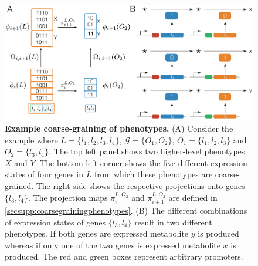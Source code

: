 \begin{figure}[!ht]
\centering
\noindent\includegraphics[width=0.9\columnwidth]{fig/phenotypehierarchy.pdf}
\caption{{\bf Example coarse-graining of phenotypes.} (A) Consider the example where $L = \{l_1,l_2,l_3,l_4\}$, $\mathcal{G} = \{ O_1, O_2 \}$, $O_1 = \{l_1, l_2, l_3\}$ and $O_2 = \{ l_3, l_4 \}$. The top left panel shows two higher-level phenotypes $X$ and $Y$. The bottom left corner shows the five different expression states of four genes in $L$ from which these phenotypes are coarse-grained. The right side shows the respective projections onto genes $\{l_3,l_4\}$. The projection maps $\pi_i^{L,O_2}$ and $\pi_{i+1}^{L,O_2}$ are defined in  \ref{secsupp:coarsegrainingphenotypes}. (B) The different combinations of expression states of genes $\{l_3,l_4\}$ result in two different phenotypes. If both genes are expressed metabolite $y$ is produced whereas if only one of the two genes is expressed metabolite $x$ is produced. The red and green boxes represent arbitrary promoters.}
\label{fig:phenotypehierarchy}
\end{figure}

